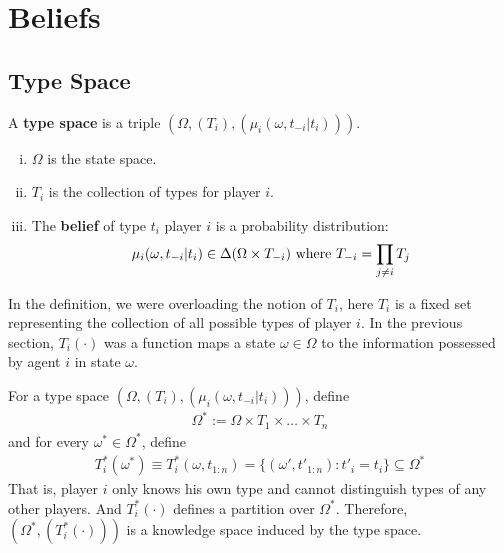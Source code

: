 \documentclass{article}
\begin{document}
   	\section{Beliefs}
   	\subsection{Type Space}
   	\begin{definition}
   		A \textbf{type space} is a triple $(\Omega, (T_i), (\mu_i(\omega, t_{-i}|t_i)))$.
   		\begin{enumerate}[(i)]
	   		\item $\Omega$ is the state space. 
	   		\item $T_i$ is the collection of types for player $i$.
	   		\item The \textbf{belief} of type $t_i$ player $i$ is a probability distribution:
	   		\begin{align}
	   			\mu_i(\omega, t_{-i}|t_i) \in \Delta(\Omega \times T_{-i})\text{{ where }} T_{-i} = \prod_{j \neq i} T_j
	   		\end{align}
	   	\end{enumerate}
   	\end{definition}
   	
   	\begin{remark}
   		In the definition, we were overloading the notion of $T_i$, here $T_i$ is a fixed set representing the collection of all possible types of player $i$. In the previous section, $T_i(\cdot)$ was a function maps a state $\omega \in \Omega$ to the information possessed by agent $i$ in state $\omega$.
   	\end{remark}
   	
   	\begin{proposition}
   		For a type space $(\Omega, (T_i), (\mu_i(\omega, t_{-i}|t_i)))$, define
   		\begin{align}
   			\Omega^{*}:=\Omega \times T_{1} \times \ldots \times T_{n}
   		\end{align}
   		and for every $\omega^* \in \Omega^*$, define
   		\begin{align}
   			T^*_i(\omega^*) \equiv T^*_i(\omega, t_{1:n}) = \{(\omega', t'_{1:n}): t'_i = t_i \} \subseteq \Omega^*
   		\end{align}
   		That is, player $i$ only knows his own type and cannot distinguish types of any other players. And $T^*_i(\cdot)$  defines a partition over $\Omega^*$. Therefore, $(\Omega^*, (T^*_i(\cdot)))$ is a knowledge space induced by the type space.
   	\end{proposition}
   	
\end{document}
